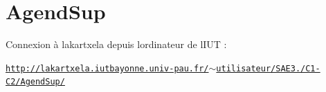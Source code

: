\chapter{Agend\+Sup }
\hypertarget{md__r_e_a_d_m_e}{}\label{md__r_e_a_d_m_e}
\label{md__r_e_a_d_m_e_autotoc_md0}%
%


Connexion à lakartxela depuis l\textquotesingle{}ordinateur de l\textquotesingle{}IUT \+:

\href{http://lakartxela.iutbayonne.univ-pau.fr/~utilisateur/SAE3.01/C1-C2/AgendSup/}{\texttt{http\+://lakartxela.\+iutbayonne.\+univ-\/pau.\+fr/\texorpdfstring{$\sim$}{\string~}utilisateur/\+SAE3./\+C1-\/\+C2/\+Agend\+Sup/}} 